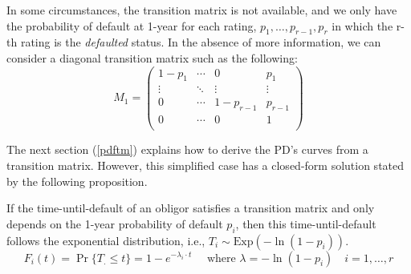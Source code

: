 \documentclass[11pt,fleqn]{book} %
\begin{document}
In some circumstances, the transition matrix is not available, and we only 
have the probability of default at 1-year for each rating, 
$p_1,\dots,p_{r-1},p_r$ in which the r-th rating is the \emph{defaulted} 
status. In the absence of more information, we can consider a diagonal 
transition matrix such as the following:
\begin{displaymath}
	M_1 = \left(
	\begin{array}{cccc}
		1-p_1  & \cdots & 0         & p_1     \\
		\vdots & \ddots & \vdots    & \vdots  \\
		0      & \cdots & 1-p_{r-1} & p_{r-1} \\
		0      & \cdots & 0         & 1       \\
	\end{array}
	\right)
\end{displaymath}

The next section (\ref{pdftm}) explains how to derive the PD's curves from a 
transition matrix. However, this simplified case has a closed-form solution 
stated by the following proposition.

\begin{proposition}
	\label{prop:pdfsv}
	If the time-until-default of an obligor satisfies a transition matrix 
	and only depends on the 1-year probability of default $p_i$, then this
	time-until-default follows the exponential distribution, i.e.,
	$T_i \sim \text{Exp}(-\ln(1-p_i))$.
	\begin{displaymath}
		F_i(t) = \Pr\{T_. \le t\} = 1 - e^{-\lambda_i \cdot t} 
		\quad \text{ where } \lambda = -\ln(1-p_i)
		\quad i=1,\dots,r
	\end{displaymath}
\end{proposition}
\end{document}
